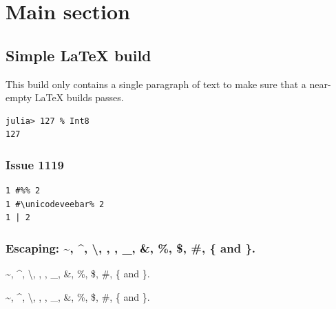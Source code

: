 \newcommand{\DocMainTitle}{Documenter LaTeX Simple Non-Docker}
\newcommand{\DocVersion}{1.2.3}
\newcommand{\DocAuthors}{}
\newcommand{\JuliaVersion}{1.14.0-DEV.1708}




\part{Main section}


\chapter{Simple LaTeX build}



\label{14824493170983545055}{}


This build only contains a single paragraph of text to make sure that a
near-empty LaTeX builds passes.




\begin{verbatim}
julia> 127 % Int8
127
\end{verbatim}



\section{Issue 1119}



\label{9207617723157778715}{}



\begin{verbatim}
1 #%% 2
1 #\unicodeveebar% 2
1 | 2
\end{verbatim}



\section{Escaping: {\textasciitilde}, {\textasciicircum}, {\textbackslash}, {\textquotesingle}, {\textquotedbl}, \_, \&, \%, \$, \#, \{ and \}.}



\label{759454356122440183}{}


{\textasciitilde}, {\textasciicircum}, {\textbackslash}, {\textquotesingle}, {\textquotedbl}, \_, \&, \%, \$, \#, \{ and \}.



\begin{tcolorbox}[toptitle=-1mm,bottomtitle=1mm,colback=admonition-info!50!white,colframe=admonition-info,title=\textbf{{\textasciitilde}, {\textasciicircum}, {\textbackslash}, {\textquotesingle}, {\textquotedbl}, \_, \&, \%, \$, \#, \{ and \}.}]
{\textasciitilde}, {\textasciicircum}, {\textbackslash}, {\textquotesingle}, {\textquotedbl}, \_, \&, \%, \$, \#, \{ and \}.

\end{tcolorbox}


